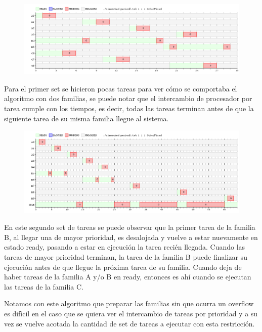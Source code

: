 \begin{figure}[H]
  \centering
\includegraphics[scale=0.45]{fixed/period2.png}
  \caption[test 1]{}
\end{figure}

Para el primer set se hicieron pocas tareas para ver cómo se comportaba el algoritmo con dos familias, se puede notar que el intercambio de procesador por tarea cumple con los tiempos, es decir, todas las tareas terminan antes de que la siguiente tarea de su misma familia llegue al sistema.

\begin{figure}[H]
  \centering
\includegraphics[scale=0.45]{fixed/period1.png}
  \caption[test 2]{}
\end{figure}

En este segundo set de tareas se puede observar que la primer tarea de la familia B, al llegar una de mayor prioridad, es desalojada y vuelve a estar nuevamente en estado ready, pasando a estar en ejecución la tarea recién llegada. Cuando las tareas de mayor prioridad terminan, la tarea de la familia B puede finalizar su ejecución antes de que llegue la próxima tarea de su familia. Cuando deja de haber tareas de la familia A y/o B en ready, entonces es ahí cuando se ejecutan las tareas de la familia C.

Notamos con este algoritmo que preparar las familias sin que ocurra un overflow es difícil en el caso que se quiera ver el intercambio de tareas por prioridad y a su vez se vuelve acotada la cantidad de set de tareas a ejecutar con esta restricción.

